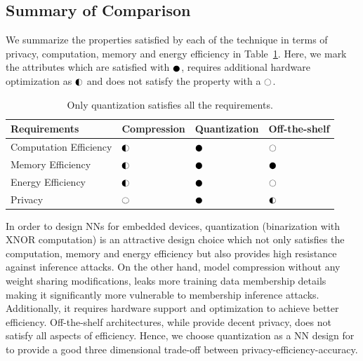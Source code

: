 

\subsection{Summary of Comparison}
\label{eval-summary}

We summarize the properties satisfied by each of the technique in terms of privacy, computation, memory and energy efficiency in Table~\ref{tbl:comparison}.
Here, we mark the attributes which are satisfied with $\cmark$, requires additional hardware optimization as $\smark$ and does not satisfy the property with a $\xmark$.

\begin{table}[!htb]
\begin{center}
\renewcommand\arraystretch{1.5}
\fontsize{6.5pt}{6.5pt}\selectfont
\begin{tabular}{|l||l|l|l|}
\hline
Requirements & Compression & Quantization & Off-the-shelf  \\
\hline
Computation Efficiency & $\smark$  & $\cmark$   & $\xmark$ \\
\hline
Memory Efficiency &  $\smark$ & $\cmark$   & $\cmark$ \\
\hline
Energy Efficiency &  $\smark$   & $\cmark$   & $\xmark$ \\
\hline
Privacy &  $\xmark$   & $\cmark$   & $\smark$ \\
\hline
\end{tabular}
\end{center}
\caption{Only quantization satisfies all the requirements.}
\label{tbl:comparison}
\vspace{-4mm}
\end{table}

In order to design NNs for embedded devices, quantization (binarization with XNOR computation) is an attractive design choice which not only satisfies the computation, memory and energy efficiency but also provides high resistance against inference attacks.
On the other hand, model compression without any weight sharing modifications, leaks more training data membership details making it significantly more vulnerable to membership inference attacks. Additionally, it requires hardware support and optimization to achieve better efficiency.
Off-the-shelf architectures, while provide decent privacy, does not satisfy all aspects of efficiency.
Hence, we choose quantization as a NN design for \method\hspace{0.01in} to provide a good three dimensional trade-off between privacy-efficiency-accuracy.


